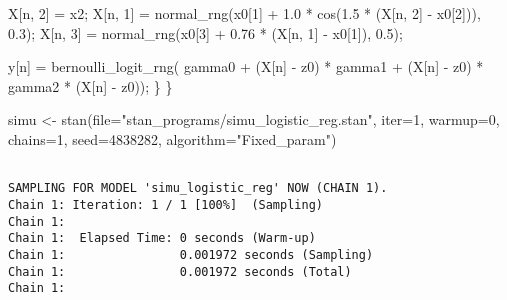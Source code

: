 \documentclass[
  letterpaper,
  DIV=11,
  numbers=noendperiod]{scrartcl}
\newenvironment{Shaded}{\begin{snugshade}}{\end{snugshade}}
\newcommand{\AttributeTok}[1]{\textcolor[rgb]{0.40,0.45,0.13}{#1}}
\newcommand{\DecValTok}[1]{\textcolor[rgb]{0.68,0.00,0.00}{#1}}
\newcommand{\FloatTok}[1]{\textcolor[rgb]{0.68,0.00,0.00}{#1}}
\newcommand{\FunctionTok}[1]{\textcolor[rgb]{0.28,0.35,0.67}{#1}}
\newcommand{\NormalTok}[1]{\textcolor[rgb]{0.00,0.23,0.31}{#1}}
\newcommand{\OtherTok}[1]{\textcolor[rgb]{0.00,0.23,0.31}{#1}}
\newcommand{\StringTok}[1]{\textcolor[rgb]{0.13,0.47,0.30}{#1}}
\begin{document}
\begin{codelisting}
\begin{Shaded}
\begin{Highlighting}[]
\NormalTok{    X[n, }\DecValTok{2}\NormalTok{] = x2;}
\NormalTok{    X[n, }\DecValTok{1}\NormalTok{] = normal\_rng(x0[}\DecValTok{1}\NormalTok{] + }\FloatTok{1.0}\NormalTok{ * cos(}\FloatTok{1.5}\NormalTok{ * (X[n, }\DecValTok{2}\NormalTok{] {-} x0[}\DecValTok{2}\NormalTok{])), }\FloatTok{0.3}\NormalTok{);}
\NormalTok{    X[n, }\DecValTok{3}\NormalTok{] = normal\_rng(x0[}\DecValTok{3}\NormalTok{] + }\FloatTok{0.76}\NormalTok{ * (X[n, }\DecValTok{1}\NormalTok{] {-} x0[}\DecValTok{1}\NormalTok{]), }\FloatTok{0.5}\NormalTok{);}

\NormalTok{    y[n] = bernoulli\_logit\_rng(  gamma0 }
\NormalTok{                               + (X[n] {-} z0\textquotesingle{}) * gamma1}
\NormalTok{                               + (X[n] {-} z0\textquotesingle{}) * gamma2 * (X[n] {-} z0\textquotesingle{})\textquotesingle{});}
\NormalTok{  \}}
\NormalTok{\}}
\end{Highlighting}
\end{Shaded}

\end{codelisting}

\begin{Shaded}
\begin{Highlighting}[]
\NormalTok{simu }\OtherTok{\textless{}{-}} \FunctionTok{stan}\NormalTok{(}\AttributeTok{file=}\StringTok{"stan\_programs/simu\_logistic\_reg.stan"}\NormalTok{,}
             \AttributeTok{iter=}\DecValTok{1}\NormalTok{, }\AttributeTok{warmup=}\DecValTok{0}\NormalTok{, }\AttributeTok{chains=}\DecValTok{1}\NormalTok{,}
             \AttributeTok{seed=}\DecValTok{4838282}\NormalTok{, }\AttributeTok{algorithm=}\StringTok{"Fixed\_param"}\NormalTok{)}
\end{Highlighting}
\end{Shaded}

\begin{verbatim}

SAMPLING FOR MODEL 'simu_logistic_reg' NOW (CHAIN 1).
Chain 1: Iteration: 1 / 1 [100%]  (Sampling)
Chain 1: 
Chain 1:  Elapsed Time: 0 seconds (Warm-up)
Chain 1:                0.001972 seconds (Sampling)
Chain 1:                0.001972 seconds (Total)
Chain 1: 
\end{verbatim}
\end{document}
